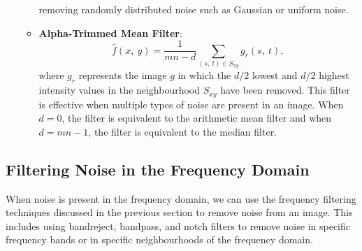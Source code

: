 \documentclass{article}
\begin{document}
\begin{itemize}
\begin{itemize}
                    removing randomly distributed noise such as Gaussian or uniform
                    noise.
              \item \textbf{Alpha-Trimmed Mean Filter}:
                    \begin{equation}
                        \hat{f}\left( x,\: y \right) = \frac{1}{mn - d} \sum_{\left( s,\: t \right) \in S_{xy}} g_r\left( s,\: t \right),
                    \end{equation}
                    where \(g_r\) represents the image \(g\) in which the
                    \(d/2\) lowest and \(d/2\) highest intensity values in
                    the neighbourhood \(S_{xy}\) have been removed. This
                    filter is effective when multiple types of noise are
                    present in an image. When \(d = 0\), the filter is
                    equivalent to the arithmetic mean filter and when
                    \(d = mn - 1\), the filter is equivalent to the median
                    filter.
          \end{itemize}
\end{itemize}
\subsection{Filtering Noise in the Frequency Domain}
When noise is present in the frequency domain, we can use the frequency
filtering techniques discussed in the previous section to remove noise
from an image. This includes using bandreject, bandpass, and notch
filters to remove noise in specific frequency bands or in specific
neighbourhoods of the frequency domain.
\end{document}
